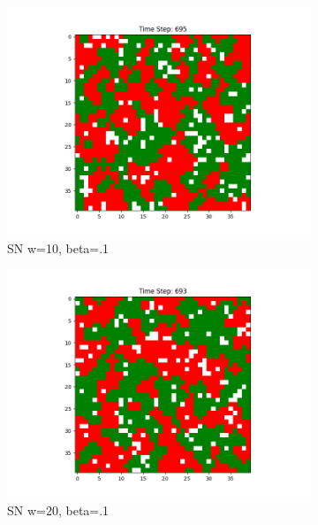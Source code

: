 \documentclass[11pt]{article}
\begin{document}
\begin{figure}[h]
\begin{subfigure}{0.14\textwidth}
			\includegraphics[width=\linewidth]{final_cluster_w10b10.png}
			\caption{\centering SN w=10, beta=.1}
		\end{subfigure}\hfill
		\begin{subfigure}{0.14\textwidth}
			\includegraphics[width=\linewidth]{final_cluster_w20b10.png}
			\caption{\centering SN w=20, beta=.1}
		\end{subfigure}\hfill
		\begin{subfigure}{0.14\textwidth}

\end{subfigure}
\end{figure}
\end{document}
